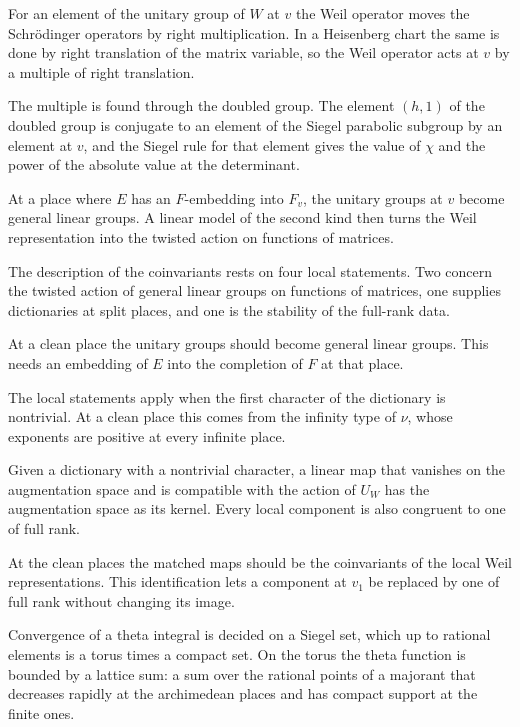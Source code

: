 For an element of the unitary group of $W$ at $v$ the Weil operator moves the
Schrödinger operators by right multiplication. In a Heisenberg chart the same is
done by right translation of the matrix variable, so the Weil operator acts at
$v$ by a multiple of right translation.

The multiple is found through the doubled group. The element $(h,1)$ of the
doubled group is conjugate to an element of the Siegel parabolic subgroup by an
element at $v$, and the Siegel rule for that element gives the value of $\chi$
and the power of the absolute value at the determinant.

At a place where $E$ has an $F$-embedding into $F_v$, the unitary groups at $v$
become general linear groups. A linear model of the second kind then turns the
Weil representation into the twisted action on functions of matrices.

The description of the coinvariants rests on four local statements. Two concern
the twisted action of general linear groups on functions of matrices, one
supplies dictionaries at split places, and one is the stability of the
full-rank data.

At a clean place the unitary groups should become general linear groups. This
needs an embedding of $E$ into the completion of $F$ at that place.

The local statements apply when the first character of the dictionary is
nontrivial. At a clean place this comes from the infinity type of $\nu$, whose
exponents are positive at every infinite place.

Given a dictionary with a nontrivial character, a linear map that vanishes on
the augmentation space and is compatible with the action of $U_W$ has the
augmentation space as its kernel. Every local component is also congruent to
one of full rank.

At the clean places the matched maps should be the coinvariants of the local
Weil representations. This identification lets a component at $v_1$ be
replaced by one of full rank without changing its image.

Convergence of a theta integral is decided on a Siegel set, which up to
rational elements is a torus times a compact set. On the torus the theta
function is bounded by a lattice sum: a sum over the rational points of a
majorant that decreases rapidly at the archimedean places and has compact
support at the finite ones.


